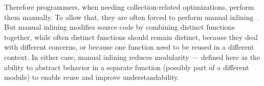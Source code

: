 Therefore programmers, when needing
collection-related optimizations, perform them manually. To allow that, they are often forced to perform manual
inlining~\citep{Peyton-Jones02}.
But manual inlining
modifies source code by combining distinct functions together, while often distinct
functions should remain distinct, because they deal with different concerns, or
because one function need to be reused in a different context.
In either case, manual inlining reduces modularity --- defined here as the
ability to abstract behavior in a separate function (possibly part of a
different module) to enable reuse and improve understandability.%


